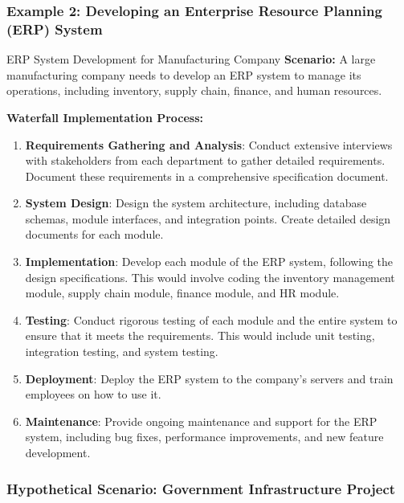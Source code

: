 \subsubsection{Example 2: Developing an Enterprise Resource Planning (ERP) System}

\begin{examplebox}{ERP System Development for Manufacturing Company}
  \textbf{Scenario:} A large manufacturing company needs to develop an ERP system to manage its operations, including inventory, supply chain, finance, and human resources.

  \textbf{Waterfall Implementation Process:}
  \begin{enumerate}
    \item \textbf{Requirements Gathering and Analysis}: Conduct extensive interviews with stakeholders from each department to gather detailed requirements. Document these requirements in a comprehensive specification document.
    \item \textbf{System Design}: Design the system architecture, including database schemas, module interfaces, and integration points. Create detailed design documents for each module.
    \item \textbf{Implementation}: Develop each module of the ERP system, following the design specifications. This would involve coding the inventory management module, supply chain module, finance module, and HR module.
    \item \textbf{Testing}: Conduct rigorous testing of each module and the entire system to ensure that it meets the requirements. This would include unit testing, integration testing, and system testing.
    \item \textbf{Deployment}: Deploy the ERP system to the company's servers and train employees on how to use it.
    \item \textbf{Maintenance}: Provide ongoing maintenance and support for the ERP system, including bug fixes, performance improvements, and new feature development.
  \end{enumerate}
\end{examplebox}

\subsubsection{Hypothetical Scenario: Government Infrastructure Project}

